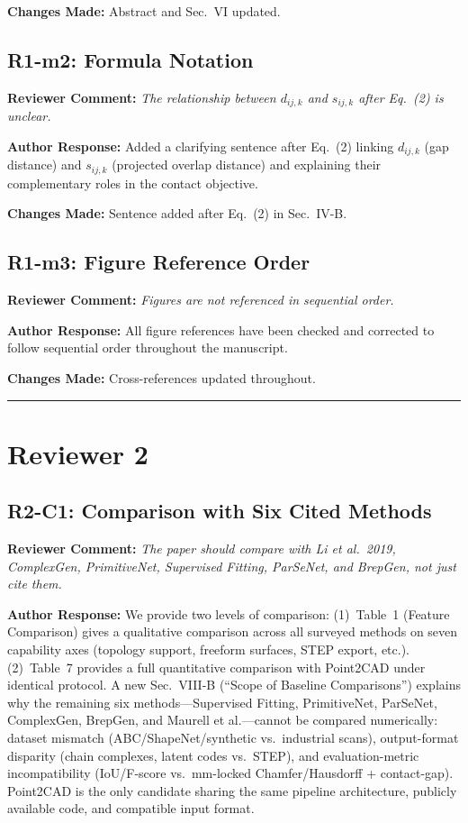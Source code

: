 \documentclass[11pt]{article}
\newcommand{\RC}[1]{\noindent\textcolor{revcolor}{\textbf{Reviewer Comment:} \emph{#1}}\par\medskip}
\newcommand{\AR}[1]{\noindent\textcolor{respcolor}{\textbf{Author Response:} #1}\par\medskip}
\newcommand{\CH}[1]{\noindent\textbf{Changes Made:} #1\par\bigskip}
\begin{document}
\CH{Abstract and Sec.~VI updated.}

\subsection*{R1-m2: Formula Notation}

\RC{The relationship between $d_{ij,k}$ and $s_{ij,k}$ after Eq.~(2)
is unclear.}

\AR{Added a clarifying sentence after Eq.~(2) linking
$d_{ij,k}$ (gap distance) and $s_{ij,k}$ (projected overlap
distance) and explaining their complementary roles in the
contact objective.}

\CH{Sentence added after Eq.~(2) in Sec.~IV-B.}

\subsection*{R1-m3: Figure Reference Order}

\RC{Figures are not referenced in sequential order.}

\AR{All figure references have been checked and corrected to
follow sequential order throughout the manuscript.}

\CH{Cross-references updated throughout.}

\bigskip\hrule\bigskip

\section*{Reviewer 2}

\subsection*{R2-C1: Comparison with Six Cited Methods}

\RC{The paper should compare with Li et al.\ 2019,
ComplexGen, PrimitiveNet, Supervised Fitting, ParSeNet,
and BrepGen, not just cite them.}

\AR{We provide two levels of comparison:
(1)~Table~1 (Feature Comparison) gives a qualitative
comparison across all surveyed methods on seven capability
axes (topology support, freeform surfaces, STEP export, etc.).
(2)~Table~7 provides a full quantitative comparison with
Point2CAD under identical protocol.
A new Sec.~VIII-B (``Scope of Baseline Comparisons'')
explains why the remaining six methods---Supervised
Fitting, PrimitiveNet, ParSeNet, ComplexGen, BrepGen,
and Maurell et al.---cannot be compared
numerically: dataset mismatch (ABC/ShapeNet/synthetic vs.\
industrial scans), output-format disparity (chain complexes,
latent codes vs.\ STEP), and evaluation-metric incompatibility
(IoU/F-score vs.\ mm-locked Chamfer/Hausdorff + contact-gap).
Point2CAD is the only candidate sharing the same pipeline
architecture, publicly available code, and compatible input format.}
\end{document}
